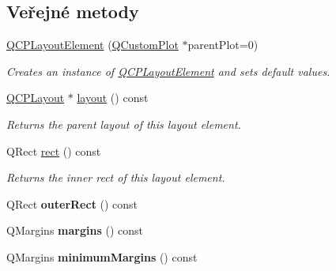 \subsection*{Veřejné metody}
\begin{DoxyCompactItemize}
\item 
\hypertarget{classQCPLayoutElement_a8947f0ada17e672aaba3d424cbbb67e3}{}\hyperlink{classQCPLayoutElement_a8947f0ada17e672aaba3d424cbbb67e3}{Q\+C\+P\+Layout\+Element} (\hyperlink{classQCustomPlot}{Q\+Custom\+Plot} $\ast$parent\+Plot=0)\label{classQCPLayoutElement_a8947f0ada17e672aaba3d424cbbb67e3}

\begin{DoxyCompactList}\small\item\em Creates an instance of \hyperlink{classQCPLayoutElement}{Q\+C\+P\+Layout\+Element} and sets default values. \end{DoxyCompactList}\item 
\hypertarget{classQCPLayoutElement_a6235f5384db871fc6e3387a1bc558b0d}{}\hyperlink{classQCPLayout}{Q\+C\+P\+Layout} $\ast$ \hyperlink{classQCPLayoutElement_a6235f5384db871fc6e3387a1bc558b0d}{layout} () const \label{classQCPLayoutElement_a6235f5384db871fc6e3387a1bc558b0d}

\begin{DoxyCompactList}\small\item\em Returns the parent layout of this layout element. \end{DoxyCompactList}\item 
Q\+Rect \hyperlink{classQCPLayoutElement_affdfea003469aac3d0fac5f4e06171bc}{rect} () const 
\begin{DoxyCompactList}\small\item\em Returns the inner rect of this layout element. \end{DoxyCompactList}\item 
\hypertarget{classQCPLayoutElement_a60bbddee2d1230c2414bd776f44d17b8}{}Q\+Rect {\bfseries outer\+Rect} () const \label{classQCPLayoutElement_a60bbddee2d1230c2414bd776f44d17b8}

\item 
\hypertarget{classQCPLayoutElement_a85ff977dfcced84eef32d9f819ec9543}{}Q\+Margins {\bfseries margins} () const \label{classQCPLayoutElement_a85ff977dfcced84eef32d9f819ec9543}

\item 
\hypertarget{classQCPLayoutElement_a60ec7f377c26726174d536bffb632002}{}Q\+Margins {\bfseries minimum\+Margins} () const \label{classQCPLayoutElement_a60ec7f377c26726174d536bffb632002}


\end{DoxyCompactItemize}
